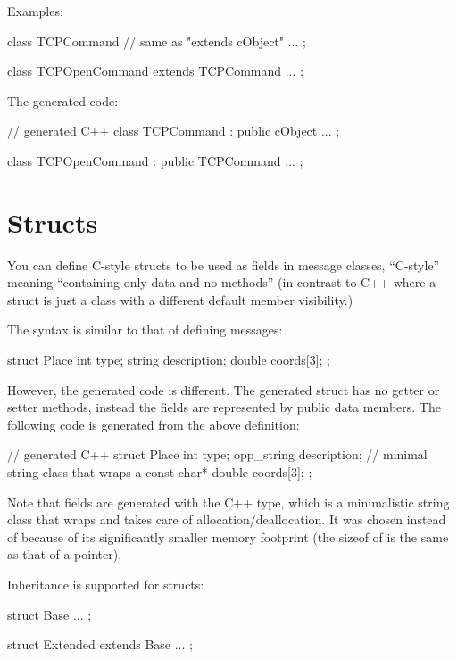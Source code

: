 Examples:

\begin{msg}
class TCPCommand  // same as "extends cObject"
{
    ...
};

class TCPOpenCommand extends TCPCommand
{
    ...
};
\end{msg}

The generated code:

\begin{cpp}
// generated C++
class TCPCommand : public cObject
{
    ...
};

class TCPOpenCommand : public TCPCommand
{
    ...
};
\end{cpp}


\section{Structs}
\label{sec:ch-msg-defs:defining-structs}

You can define C-style structs to be used as fields in message classes,
``C-style'' meaning ``containing only data and no methods'' (in contrast to
C++ where a struct is just a class with a different default member
visibility.)

The syntax is similar to that of defining messages:

\begin{msg}
struct Place
{
    int type;
    string description;
    double coords[3];
};
\end{msg}

However, the generated code is different. The generated struct has
no getter or setter methods, instead the fields are represented
by public data members. The following code is generated from
the above definition:

\begin{cpp}
// generated C++
struct Place
{
    int type;
    opp_string description; // minimal string class that wraps a const char*
    double coords[3];
};
\end{cpp}

Note that  fields are generated with the 
C++ type, which is a minimalistic string class that wraps 
and takes care of allocation/deallocation. It was chosen instead of
 because of its significantly smaller memory footprint
(the sizeof of  is the same as that of a 
pointer).

Inheritance is supported for structs:

\begin{msg}
struct Base
{
    ...
};

struct Extended extends Base
{
    ...
};
\end{msg}


